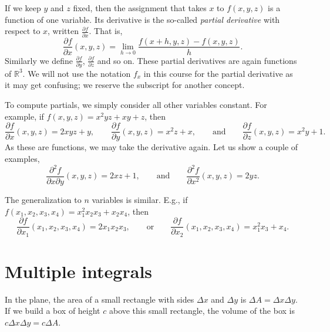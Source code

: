 \documentclass[12pt]{article}
\newcommand{\R}{{\mathbb{R}}}
\begin{document}
If we keep $y$ and $z$ fixed, then the assignment that takes $x$ to $f(x,y,z)$ is a
function of one variable.
Its derivative is the so-called \emph{partial derivative} with respect to $x$,
written $\frac{\partial f}{\partial x}$.  That is,
\[
\frac{\partial f}{\partial x}(x,y,z) =
\lim_{h\to 0} \frac{f(x+h,y,z)-f(x,y,z)}{h} .
\]
Similarly we define
$\frac{\partial f}{\partial y}$,
$\frac{\partial f}{\partial z}$ and so on.  These partial derivatives are again
functions of $\R^3$.
We will not use the notation $f_x$ in this
course for the partial derivative as
it may get confusing;
we reserve the subscript for another concept.

To compute partials, we simply consider all other variables constant.
For example, if $f(x,y,z) = x^2yz + xy + z$, then
\[
\frac{\partial f}{\partial x}(x,y,z) = 2xyz + y,
\qquad
\frac{\partial f}{\partial y}(x,y,z) = x^2z + x,
\qquad \text{and} \qquad
\frac{\partial f}{\partial z}(x,y,z) = x^2y + 1 .
\]
As these are functions, we may take the derivative again.  Let us show a couple of examples,
\[
\frac{\partial^2 f}{\partial x \partial y}(x,y,z) = 2xz + 1,
\qquad \text{and} \qquad
\frac{\partial^2 f}{\partial x^2}(x,y,z) = 2yz .
\]

The generalization to $n$ variables is similar.  E.g.,
if $f(x_1,x_2,x_3,x_4) = x_1^2x_2x_3 + x_2 x_4$, then
\[
\frac{\partial f}{\partial x_1}(x_1,x_2,x_3,x_4) = 2x_1 x_2 x_3,
\qquad \text{or} \qquad
\frac{\partial f}{\partial x_2}(x_1,x_2,x_3,x_4) = x_1^2 x_3 + x_4 .
\]

\section{Multiple integrals}

In the plane, the area of a small rectangle with sides $\Delta x$ and $\Delta y$
is $\Delta A = \Delta x \Delta y$.
If we build a box of height $c$ above
this small rectangle, the volume of the box is $c \Delta x \Delta y = c \Delta A$.
\end{document}
